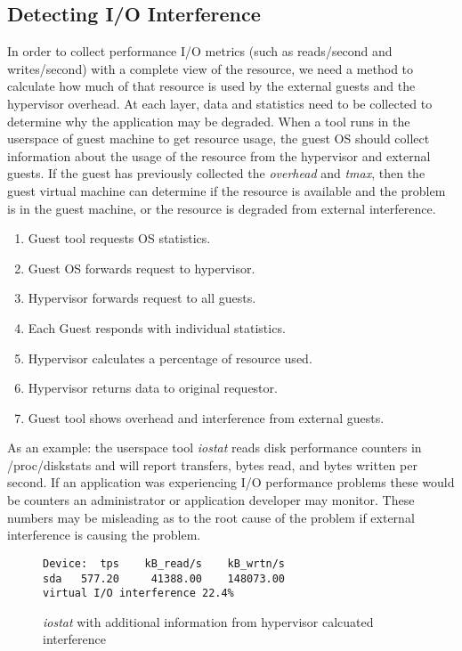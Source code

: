 \subsection{Detecting I/O Interference}
In order to collect performance I/O metrics (such as reads/second and writes/second) with a complete view of the resource, we need a method to calculate how much of that resource is used by the external guests and the hypervisor overhead.  At each layer, data and statistics need to be collected to determine why the application may be degraded.
\indent When a tool runs in the userspace of guest machine to get resource usage, the guest OS should collect information about the usage of the resource from the hypervisor and external guests.  If the guest has previously collected the  \emph{overhead} and \emph{tmax}, then the guest virtual machine can determine if the resource is available and the problem is in the guest machine, or the resource is degraded from external interference.

\begin{enumerate}
	\item Guest tool requests OS statistics.
	\item Guest OS forwards request to hypervisor.
	\item Hypervisor forwards request to all guests.
	\item Each Guest responds with individual statistics.
	\item Hypervisor calculates a percentage of resource used.
	\item Hypervisor returns data to original requestor.
	\item Guest tool shows overhead and interference from external guests.
\end{enumerate}

As an example: the userspace tool \emph{iostat} reads disk performance counters in /proc/diskstats and will report transfers, bytes read, and bytes written per second.  If an application was experiencing I/O performance problems these would be counters an administrator or application developer may monitor.  These numbers may be misleading as to the root cause of the problem if external interference is causing the problem.  
\begin{figure}
\begin{Verbatim}
Device:  tps    kB_read/s    kB_wrtn/s
sda   577.20     41388.00    148073.00
virtual I/O interference 22.4%     
\end{Verbatim}
\label{fig:iostat}
\caption{\emph{iostat} with additional information from hypervisor calcuated interference}
\end{figure}

